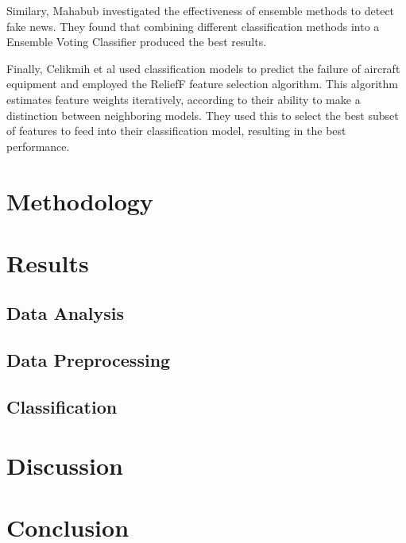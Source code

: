 \documentclass[conference]{IEEEtran}
\begin{document}
Similary, Mahabub \cite{Mahabub2020} investigated the effectiveness of ensemble methods to detect fake news. They found that combining different classification methods into a Ensemble Voting Classifier produced the best results.

Finally, Celikmih et al \cite{celikmih2020} used classification models to predict the failure of aircraft equipment and employed the ReliefF feature selection algorithm. This algorithm estimates feature weights iteratively, according to their ability to make a distinction between neighboring models. They used this to select the best subset of features to feed into their classification model, resulting in the best performance.

\section{Methodology}

\section{Results}

\subsection{Data Analysis}

\subsection{Data Preprocessing}

\subsection{Classification}

\section{Discussion}

\section{Conclusion}



\end{document}
